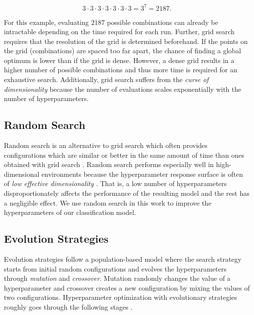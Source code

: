 \documentclass[draft,final]{vutinfth} %
\begin{document}
\begin{equation}
  \label{eq:hypopt-nums}
  3\cdot3\cdot3\cdot3\cdot3\cdot3\cdot3 = 3^{7} = 2187.
\end{equation}

For this example, evaluating $2187$ possible combinations can already
be intractable depending on the time required for each run. Further,
grid search requires that the resolution of the grid is determined
beforehand. If the points on the grid (combinations) are spaced too
far apart, the chance of finding a global optimum is lower than if the
grid is dense. However, a dense grid results in a higher number of
possible combinations and thus more time is required for an exhaustive
search. Additionally, grid search suffers from the \emph{curse of
dimensionality} because the number of evaluations scales exponentially
with the number of hyperparameters.

\subsection{Random Search}
\label{ssec:hypopt-random-search}

Random search \cite{pinto2009} is an alternative to grid search which
often provides configurations which are similar or better in the same
amount of time than ones obtained with grid search
\cite{bergstra2012}. Random search performs especially well in
high-dimensional environments because the hyperparameter response
surface is often of \emph{low effective dimensionality}
\cite{bergstra2012}. That is, a low number of hyperparameters
disproportionately affects the performance of the resulting model and
the rest has a negligible effect. We use random search in this work to
improve the hyperparameters of our classification model.

\subsection{Evolution Strategies}
\label{ssec:hypopt-evo}

Evolution strategies follow a population-based model where the search
strategy starts from initial random configurations and evolves the
hyperparameters through \emph{mutation} and \emph{crossover}. Mutation
randomly changes the value of a hyperparameter and crossover creates a
new configuration by mixing the values of two
configurations. Hyperparameter optimization with evolutionary
strategies roughly goes through the following stages
\cite{bischl2023}.
\end{document}
